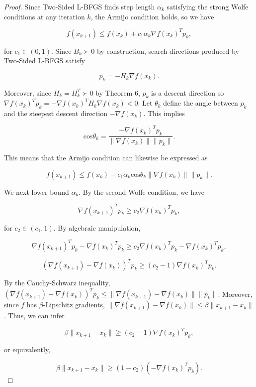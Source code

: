 \documentclass[twoside,11pt]{article}
\begin{document}
\begin{proof}
Since Two-Sided L-BFGS finds step length $\alpha_k$ satisfying the strong Wolfe conditions at any iteration $k$, the Armijo condition holds, so we have

\begin{equation}
f(x_{k+1}) \leq f(x_k) + c_1\alpha_k \nabla f(x_k)^Tp_k,
\end{equation}

\noindent
for $c_1 \in (0,1)$. Since $B_k \succ 0$ by construction, search directions produced by Two-Sided L-BFGS satisfy

\[
p_k = -H_k \nabla f(x_k).
\]

\noindent
Moreover, since $H_k = H_k^T \succ 0$ by Theorem 6, $p_k$ is a descent direction so $\nabla f(x_k)^T p_k = -\nabla f(x_k)^T H_k \nabla f(x_k) < 0$. Let $\theta_k$ define the angle between $p_k$ and the steepest descent direction $-\nabla f(x_k)$. This implies

\begin{equation}
\text{cos}\theta_k = \frac{-\nabla f(x_k)^T p_k}{\|\nabla f(x_k)\| \|p_k\|}.
\end{equation}

\noindent
This means that the Armijo condition can likewise be expressed as

\[
f(x_{k+1}) \leq f(x_k) - c_1 \alpha_k \text{cos}\theta_k \|\nabla f(x_k)\| \|p_k\|.
\]

\noindent
We next lower bound $\alpha_k$. By the second Wolfe condition, we have

\[
\nabla f(x_{k+1})^T p_k \geq c_2 \nabla f(x_k)^T p_k,
\]

\noindent
for $c_2 \in (c_1, 1)$. By algebraic manipulation,

\[
\nabla f(x_{k+1})^T p_k - \nabla f(x_k)^T p_k \geq c_2 \nabla f(x_k)^Tp_k - \nabla f(x_k)^T p_k,
\]

\[
(\nabla f(x_{k+1})-\nabla f(x_k))^T p_k \geq (c_2 - 1)\nabla f(x_k)^Tp_k.
\]

\noindent
By the Cauchy-Schwarz inequality, $(\nabla f(x_{k+1})-\nabla f(x_k))^T p_k \leq \|\nabla f(x_{k+1})-\nabla f(x_k)\| \|p_k\|$. Moreover, since $f$ has $\beta$-Lipschitz gradients, $\|\nabla f(x_{k+1})-\nabla f(x_k)\| \leq \beta \|x_{k+1} - x_k \|$. Thus, we can infer

\[
\beta \|x_{k+1} - x_k\| \geq (c_2 - 1)\nabla f(x_k)^T p_k,
\]

\noindent
or equivalently,

\[
\beta \|x_{k+1} - x_k\| \geq (1-c_2)(-\nabla f(x_k)^T p_k).
\]


\end{proof}
\end{document}
